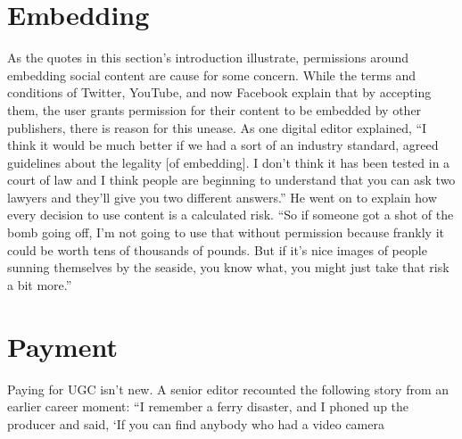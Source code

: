 \begin{enumerate}
\section{Embedding}
As the quotes in this section's introduction illustrate, permissions around
embedding social content are cause for some concern. While the terms and
conditions of Twitter, YouTube, and now Facebook explain that by accepting
them, the user grants permission for their content to be embedded by
other publishers, there is reason for this unease.
As one digital editor explained, ``I think it would be much better if we had a
sort of an industry standard, agreed guidelines about the legality [of embedding].
I don't think it has been tested in a court of law and I think people are
beginning to understand that you can ask two lawyers and they'll give you
two different answers.''
He went on to explain how every decision to use content is a calculated risk.
``So if someone got a shot of the bomb going off, I'm not going to use that
without permission because frankly it could be worth tens of thousands of
pounds. But if it's nice images of people sunning themselves by the seaside,
you know what, you might just take that risk a bit more.''
\section{Payment}
Paying for UGC isn't new. A senior editor recounted the following story
from an earlier career moment: ``I remember a ferry disaster, and I phoned
up the producer and said, ‘If you can find anybody who had a video camera


\end{enumerate}
